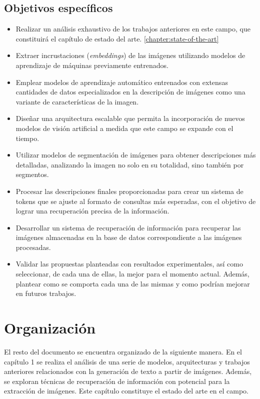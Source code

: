 \subsection*{Objetivos espec\'ificos}

\begin{itemize}
\item Realizar un an\'alisis exhaustivo de los trabajos anteriores en este campo, que constituir\'a el cap\'itulo de estado del arte. \ref{chapter:state-of-the-art}   
\item Extraer incrustaciones (\textit{embeddings}) de las im\'agenes utilizando modelos de aprendizaje de m\'aquinas previamente entrenados.
\item Emplear modelos de aprendizaje autom\'atico entrenados con extensas cantidades de datos especializados en la descripci\'on de im\'agenes como una variante de caracter\'isticas de la imagen.
\item Dise\~nar una arquitectura escalable que permita la incorporaci\'on de nuevos modelos de visi\'on artificial a medida que este campo se expande con el tiempo.
\item Utilizar modelos de segmentaci\'on de im\'agenes para obtener descripciones m\'as detalladas, analizando la imagen no solo en su totalidad, sino tambi\'en por segmentos.
\item Procesar las descripciones finales proporcionadas para crear un sistema de tokens que se ajuste al formato de consultas m\'as esperadas, con el objetivo de lograr una recuperaci\'on precisa de la informaci\'on.
\item Desarrollar un sistema de recuperaci\'on de informaci\'on para recuperar las im\'agenes almacenadas en la base de datos correspondiente a las im\'agenes procesadas.
\item Validar las propuestas planteadas con resultados experimentales, as\'i como seleccionar, de cada una de ellas, la mejor para el momento actual. Adem\'as, plantear como se comporta cada una de las mismas y como podr\'ian mejorar en futuros trabajos.
\end{itemize}

\section*{Organizaci\'on}
El resto del documento se encuentra organizado de la siguiente manera. En el cap\'itulo 1 se realiza el an\'alisis de una serie de modelos, arquitecturas y trabajos anteriores relacionados con la generaci\'on de texto a partir de im\'agenes. Adem\'as, se exploran t\'ecnicas de recuperaci\'on de informaci\'on con potencial para la extracci\'on de im\'agenes. Este cap\'itulo constituye el estado del arte en el campo.

